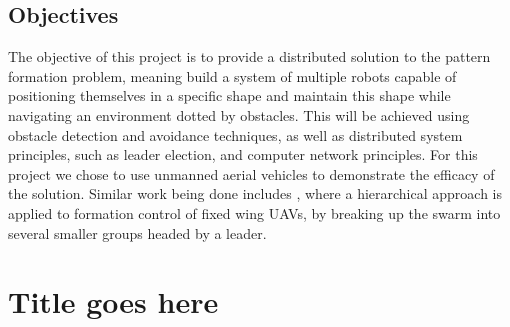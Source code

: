 \section{Objectives}

The objective of this project is to provide a distributed solution to the pattern formation problem, meaning
build a system of multiple robots capable of positioning themselves in a specific shape and maintain this
shape while navigating an environment dotted by obstacles. This will be achieved using obstacle detection
and avoidance techniques, as well as distributed system principles, such as leader election, and computer
network principles. For this project we chose to use unmanned aerial vehicles to demonstrate the efficacy
of the solution. Similar work being done includes \autocite{HC21}, where a hierarchical approach is applied
to formation control of fixed wing UAVs, by breaking up the swarm into several smaller groups headed by a 
leader.


\chapter{Title goes here}




\printbibliography

